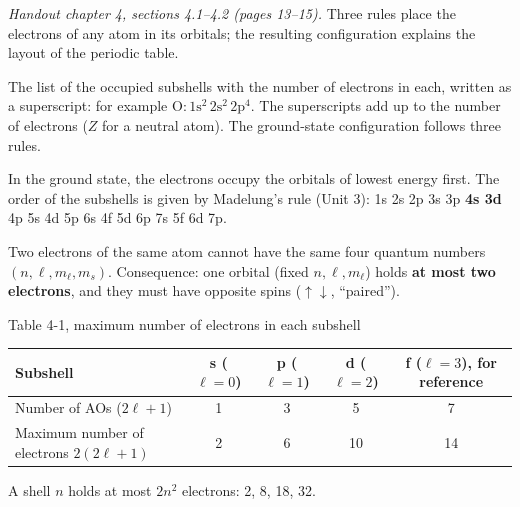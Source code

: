 
\textit{Handout chapter 4, sections 4.1--4.2 (pages 13--15).} Three rules place the electrons of any
atom in its orbitals; the resulting configuration explains the layout of the periodic table.


\begin{concept}
The list of the occupied subshells with the number of electrons in each, written as a superscript:
for example $\mathrm{O}\colon 1\mathrm s^2\,2\mathrm s^2\,2\mathrm p^4$. The superscripts add up to the number
of electrons ($Z$ for a neutral atom). The ground-state configuration follows three rules.
\end{concept}

\begin{concept}
In the ground state, the electrons occupy the orbitals of lowest energy first. The order of the
subshells is given by Madelung's rule (Unit 3):
1s 2s 2p 3s 3p \textbf{4s 3d} 4p 5s 4d 5p 6s 4f 5d 6p 7s 5f 6d 7p.
\end{concept}

\begin{concept}
Two electrons of the same atom cannot have the same four quantum numbers $(n,\ell,m_\ell,m_s)$.
Consequence: one orbital (fixed $n,\ell,m_\ell$) holds \textbf{at most two electrons}, and they must
have opposite spins ($\uparrow\downarrow$, ``paired'').
\end{concept}
\begin{handout}{Table 4-1, maximum number of electrons in each subshell}
\begin{center}\small
\begin{tabular}{|l|c|c|c|c|}
\hline
Subshell & s ($\ell = 0$) & p ($\ell = 1$) & d ($\ell = 2$) & f ($\ell = 3$), for reference\\ \hline
Number of AOs ($2\ell+1$) & 1 & 3 & 5 & 7\\ \hline
Maximum number of electrons $2(2\ell+1)$ & 2 & 6 & 10 & 14\\ \hline
\end{tabular}
\end{center}
A shell $n$ holds at most $2n^2$ electrons: 2, 8, 18, 32.
\end{handout}

